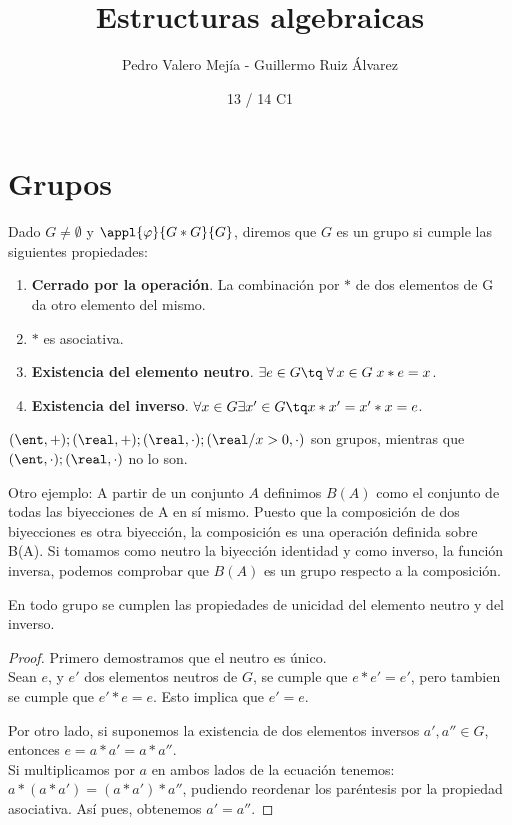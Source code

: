 \documentclass[nochap]{apuntes}
\title{Estructuras algebraicas}
\author{Pedro Valero Mejía - Guillermo Ruiz Álvarez}
\date{13 / 14 C1}
\begin{document}
\pagestyle{plain}
\maketitle
\tableofcontents
\newpage

\section{Grupos}

\begin{defn}[Grupo]
Dado $G\neq \emptyset$  y $\appl{\varphi}{G\ast G}{G}$, diremos que $G$ es un grupo si cumple las siguientes propiedades:
\begin{enumerate}
\item \textbf{Cerrado por la operación}. La combinación por $\ast$  de dos elementos de G da otro elemento del mismo.
\item $\ast$ es asociativa.
\item \textbf{Existencia del elemento neutro}. $\exists  e \in G \tq \; \forall\, x\in G\; x\ast e=x$.
\item \textbf{Existencia del inverso}. $\forall x \in G \exists x' \in G \tq x\ast x'=x'\ast x=e$.
\end{enumerate}
\end{defn}

\begin{example}
  $ (\ent, +); (\real, +); (\real, \cdot); (\real/x>0, \cdot)$ son grupos, mientras que
  $(\ent, \cdot); (\real, \cdot)$ no lo son.

  Otro ejemplo: A partir de un conjunto $A$ definimos $B(A)$ como el conjunto de todas las biyecciones de A en sí mismo.  Puesto que la composición de dos biyecciones es otra biyección, la composición es una operación definida sobre B(A). Si tomamos como neutro la biyección identidad y como inverso, la función inversa, podemos comprobar que $B(A)$ es un grupo respecto a la composición.
\end{example}

\begin{theorem}
  En todo grupo se cumplen las propiedades de unicidad del elemento neutro y del inverso.
\end{theorem}

\begin{proof}
Primero demostramos que el neutro es único. \\
Sean $e$, y $e'$ dos elementos neutros de $G$, se cumple que $e\ast e'=e'$, pero tambien se cumple que $e'\ast e=e$. Esto implica que $e'=e$.

Por otro lado, si suponemos la existencia de dos elementos inversos $a',a''\in G$, entonces $e=a\ast a'=a\ast a''$. \\
Si multiplicamos por $a$ en ambos lados de la ecuación tenemos: $a\ast (a\ast a')=(a\ast a')\ast a''$, pudiendo reordenar los paréntesis por la
propiedad asociativa. Así pues, obtenemos $a'=a''$.
\end{proof}
\end{document}
